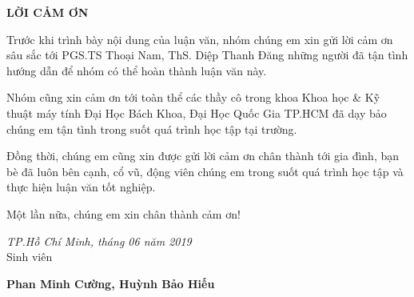 \centerline{\bf \large\MakeUppercase{Lời cảm ơn}}

\vspace{20pt}

Trước khi trình bày nội dung của luận văn, nhóm chúng em xin gửi lời cảm ơn sâu sắc tới PGS.TS Thoại Nam, ThS. Diệp Thanh Đăng những người đã tận tình hướng dẫn để nhóm có thể hoàn thành luận văn này.

Nhóm cũng xin cảm ơn tới toàn thể các thầy cô trong khoa Khoa học \& Kỹ thuật máy tính Đại Học Bách Khoa, Đại Học Quốc Gia TP.HCM đã dạy bảo chúng em tận tình trong suốt quá trình học tập tại trường.

Đồng thời, chúng em cũng xin được gửi lời cảm ơn chân thành tới gia đình, bạn bè đã luôn bên cạnh, cổ vũ, động viên chúng em trong suốt quá trình học tập và thực hiện luận văn tốt nghiệp. 

Một lần nữa, chúng em xin chân thành cảm ơn! 

\begin{flushright}
	{\it TP.Hồ Chí Minh, tháng 06 năm 2019}\\

	Sinh viên \hskip 2.5cm\quad
	
	\vskip 1cm
	{\bf Phan Minh Cường, Huỳnh Bảo Hiếu} \quad\ 
\end{flushright}
